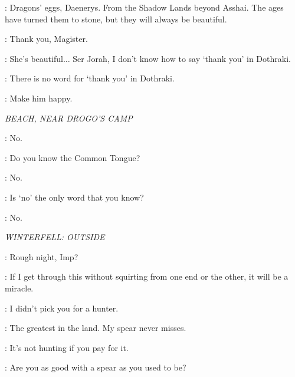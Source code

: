
\ILLYRIO: Dragons' eggs, Daenerys. From the Shadow Lands beyond Asshai. The ages have turned them to stone, but they will always be beautiful. 

\DAENERYS: Thank you, Magister. 


\DAENERYS: She's beautiful$\ldots$ Ser Jorah, I don't know how to say `thank you' in Dothraki. 

\JORAH: There is no word for `thank you' in Dothraki. 


\VISERYS: Make him happy. 


\scene

\textit{BEACH, NEAR DROGO'S CAMP} 


\DROGO: No. 

\DAENERYS: Do you know the Common Tongue? 

\DROGO: No. 

\DAENERYS: Is `no' the only word that you know? 

\DROGO: No. 



\scene

\textit{WINTERFELL: OUTSIDE} 


\HOUND: Rough night, Imp? 

\TYRION: If I get through this without squirting from one end or the other, it will be a miracle. 

\HOUND: I didn't pick you for a hunter. 

\TYRION: The greatest in the land. My spear never misses. 

\HOUND: It's not hunting if you pay for it. 


\ROBERT: Are you as good with a spear as you used to be? 


